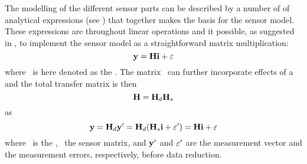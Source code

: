  The modelling of the different sensor parts can be described by a
 number of of analytical expressions (see \citet{eriksson:97a}) that
 together makes the basis for the sensor model. These expressions are
 throughout linear operations and it possible, as suggested in
 \citet{eriksson:00a}, to implement the sensor model as a
 straightforward matrix multiplication:
 \begin{equation}
   \mathbf{y} = \mathbf{H} \mathbf{i} + \varepsilon
  \label{eq:formalism:H}
 \end{equation}
 where \SnsMtr\ is here denoted as the .  The matrix \SnsMtr\ can further incorporate effects of a
  and the total transfer matrix is then
 \begin{equation}
   \mathbf{H} = \mathbf{H}_{d} \mathbf{H}_{s}
  \label{eq:formalism:Hs}
 \end{equation}
 as
 \begin{equation}
   \mathbf{y} = \mathbf{H}_{d} \mathbf{y}' = \mathbf{H}_{d} (\mathbf{H}_{s} \mathbf{i} + 
                                    \varepsilon') = \mathbf{H} \mathbf{i} + \varepsilon
  \label{eq:formalism:datared}
 \end{equation}
 where \ is the ,
 \ the sensor matrix, and $\mathbf{y}'$ and $\varepsilon'$ are
 the measurement vector and the measurement errors, respectively,
 before data reduction.



 \label{sec:formalism:wfuns}
 
 
